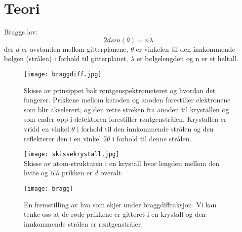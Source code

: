 \documentclass[norsk,a4paper,12pt]{article}
\begin{document}
\section{Teori}

Braggs lov:
\begin{equation}
2dsin(\theta) = n\lambda
\label{bragg}
\end{equation}
der $d$ er avstanden mellom gitterplanene, $\theta$ er vinkelen til den innkommende bølgen (strålen) i forhold til gitterplanet, $\lambda$ er bølgelengden og n er et heltall.\\ 

\begin{figure}
	\begin{center}
  	\texttt{[image: braggdiff.jpg]}\\
	\caption[Skisse av røntgenspektrometer]{Skisse av prinsippet bak røntgenspektrometeret og 
	hvordan det fungerer. Prikkene mellom katoden og anoden forestiller elektronene som blir akselerert, og den rette streken fra anoden til krystallen og som ender opp i detektoren forestiller røntgenstrålen. Krystallen er vridd en vinkel $\theta$ i forhold til den innkommende strålen og den reflekterer den i en vinkel $2\theta$ i forhold til denne strålen.}
	\label{skissebragg}
	\end{center}
\end{figure}
\begin{figure}
	\begin{minipage}{0.5\linewidth}
	\texttt{[image: skissekrystall.jpg]}\\
	\caption[Skisse av atom-strukturen i en krystall]{Skisse av atom-strukturen i en krystall hvor lengden mellom den hvite og blå prikken er $d$ overalt}
	\label{krystall}
	\end{minipage}
	\hspace{.5cm}
	\begin{minipage}{0.5\linewidth}
	\texttt{[image: bragg]}\\
	\caption[Prinsippet bak Bragg's lov]{En fremstilling av hva som skjer under braggdiffraksjon. Vi kan tenke oss at de røde prikkene er gitteret i en krystall og den innkommende strålen er røntgenstråler}
	\label{bragg}
	\end{minipage}
\end{figure}
\end{document}
